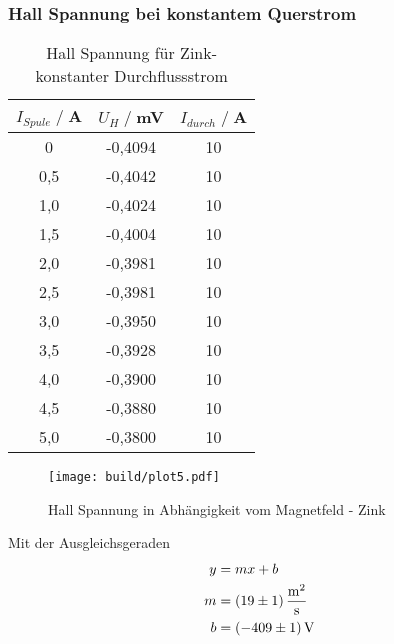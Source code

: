\subsubsection{Hall Spannung bei konstantem Querstrom}
\begin{table}[H]
    \centering
    \begin{tabular}{c c c}
        \toprule
        $I_{Spule} \;/\;$A & $U_H\;/\;$mV & $I_{durch} \;/\;$A\\
        \midrule
            0                   &-0,4094&             10\\
            0,5                 &-0,4042&             10\\
            1,0                 &-0,4024&             10\\
            1,5                 &-0,4004&             10\\
            2,0                 &-0,3981&             10\\
            2,5                 &-0,3981&             10\\
            3,0                 &-0,3950&             10\\
            3,5                 &-0,3928&             10\\
            4,0                 &-0,3900&             10\\
            4,5                 &-0,3880&             10\\
            5,0                 &-0,3800&             10\\
        \bottomrule
    \end{tabular}
    \caption{Hall Spannung für Zink- konstanter Durchflussstrom}
    \label{tab:Zn_B}
\end{table}
\begin{figure}[H]
    \centering
    \texttt{[image: build/plot5.pdf]}
    \caption{Hall Spannung in Abhängigkeit vom Magnetfeld - Zink}
    \label{fig:Zn_B}
\end{figure}
Mit der Ausgleichsgeraden
\begin{align*}
    y &= mx + b\\
    m &= \SI{19 \pm 1}{\square \meter \per \second} \\
    b &= \SI{-409 \pm 1}{\volt} \\ 
\end{align*}

